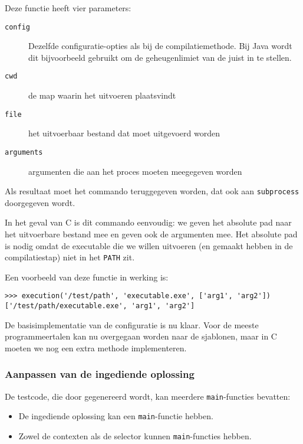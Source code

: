 \inputminted[firstline=19,lastline=22,gobble=4]{python}{sources/c-config.py}

Deze functie heeft vier parameters:

\begin{description}
    \item[\texttt{config}] Dezelfde configuratie-opties als bij de compilatiemethode. 
    Bij Java wordt dit bijvoorbeeld gebruikt om de geheugenlimiet van de  juist in te stellen.
    \item[\texttt{cwd}] de map waarin het uitvoeren plaatsvindt
    \item[\texttt{file}] het uitvoerbaar bestand dat moet uitgevoerd worden
    \item[\texttt{arguments}] argumenten die aan het proces moeten meegegeven worden
\end{description}

Als resultaat moet het commando teruggegeven worden, dat ook aan \texttt{subprocess} doorgegeven wordt.

In het geval van C is dit commando eenvoudig: we geven het absolute pad naar het uitvoerbare bestand mee en geven ook de argumenten mee.
Het absolute pad is nodig omdat de executable die we willen uitvoeren (en gemaakt hebben in de compilatiestap) niet in het \texttt{PATH} zit.

Een voorbeeld van deze functie in werking is:

\begin{verbatim}
>>> execution('/test/path', 'executable.exe', ['arg1', 'arg2'])
['/test/path/executable.exe', 'arg1', 'arg2']
\end{verbatim}

De basisimplementatie van de configuratie is nu klaar.
Voor de meeste programmeertalen kan nu overgegaan worden naar de sjablonen, maar in C moeten we nog een extra methode implementeren.

\subsubsection{Aanpassen van de ingediende oplossing}

De testcode, die door \tested{} gegenereerd wordt, kan meerdere \texttt{main}-functies bevatten:

\begin{itemize}
    \item De ingediende oplossing kan een \texttt{main}-functie hebben.
    \item Zowel de contexten als de selector kunnen \texttt{main}-functies hebben.
\end{itemize}

